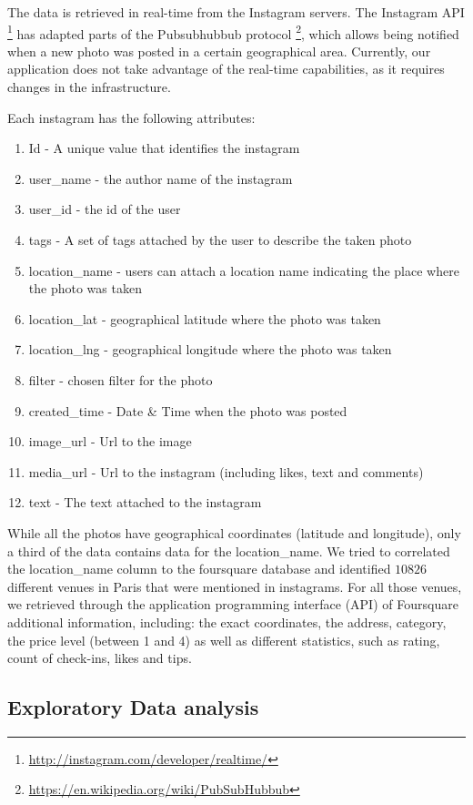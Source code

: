 The data is retrieved in real-time from the Instagram servers. The Instagram API \footnote{\url{http://instagram.com/developer/realtime/}} has adapted parts of the Pubsubhubbub protocol \footnote{\url{https://en.wikipedia.org/wiki/PubSubHubbub}}, which allows being notified when a new photo was posted in a certain geographical area. Currently, our application does not take advantage of the real-time capabilities, as it requires changes in the infrastructure.

Each instagram has the following attributes:
\begin{enumerate}
  \item Id - A unique value that identifies the instagram
  \item user\_name - the author name of the instagram
  \item user\_id - the id of the user
  \item tags - A set of tags attached by the user to describe the taken photo
  \item location\_name - users can attach a location name indicating the place where the photo was taken
  \item location\_lat - geographical latitude where the photo was taken
  \item location\_lng - geographical longitude where the photo was taken
  \item filter - chosen filter for the photo
  \item created\_time - Date \& Time when the photo was posted
  \item image\_url - Url to the image
  \item media\_url - Url to the instagram (including likes, text and comments)
  \item text - The text attached to the instagram
\end{enumerate}

While all the photos have geographical coordinates (latitude and longitude), only a third of the data contains data for the location\_name. We tried to correlated the location\_name column to the foursquare database and identified $10826$ different venues in Paris that were mentioned in instagrams. For all those venues, we retrieved through the application programming interface (API) of Foursquare additional information, including: the exact coordinates, the address, category, the price level (between 1 and 4) as well as different statistics, such as rating, count of check-ins, likes and tips.

\subsection{Exploratory Data analysis}

